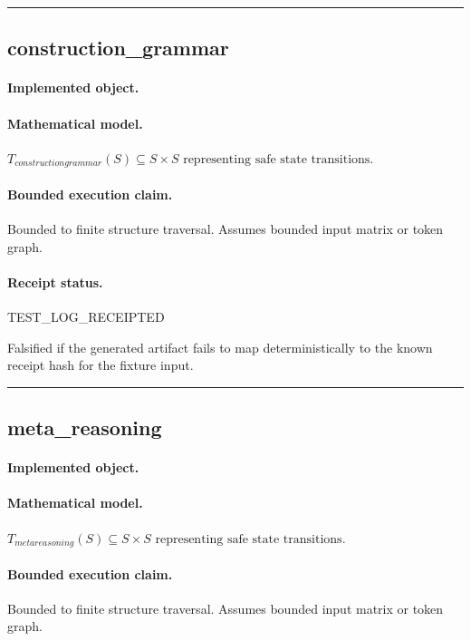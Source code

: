 \vspace{1em}\hrule\vspace{1em}
\subsection{construction\_grammar}
\paragraph{Implemented object.} 
\paragraph{Mathematical model.} $T_{constructiongrammar}(S) \subseteq S \times S \text{ representing safe state transitions}.$
\paragraph{Bounded execution claim.} Bounded to finite structure traversal. Assumes bounded input matrix or token graph.
\paragraph{Receipt status.} TEST\_LOG\_RECEIPTED
\begin{falsifier}
Falsified if the generated artifact fails to map deterministically to the known receipt hash for the fixture input.
\end{falsifier}

\vspace{1em}\hrule\vspace{1em}
\subsection{meta\_reasoning}
\paragraph{Implemented object.} 
\paragraph{Mathematical model.} $T_{metareasoning}(S) \subseteq S \times S \text{ representing safe state transitions}.$
\paragraph{Bounded execution claim.} Bounded to finite structure traversal. Assumes bounded input matrix or token graph.

